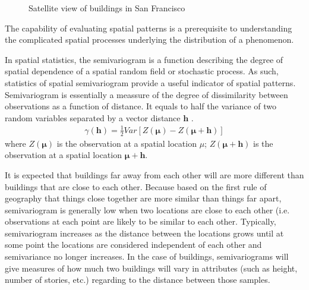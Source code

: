 \documentclass[letterpaper,10pt,english]{sphinxmanual}
\begin{document}
\begin{figure}[htbp]
\centering
\capstart

\noindent{}
\caption{Satellite view of buildings in San Francisco}\label{\detokenize{common/technical_manual/framework:id14}}\label{\detokenize{common/technical_manual/framework:brailsmapsf}}\end{figure}

\sphinxAtStartPar
The capability of evaluating spatial patterns is a prerequisite to understanding the
complicated spatial processes underlying the distribution of a phenomenon.

\sphinxAtStartPar
In spatial statistics, the semivariogram is a function describing the degree of spatial
dependence of a spatial random field or stochastic process.
As such, statistics of spatial semivariogram provide a useful indicator of spatial patterns.
Semivariogram is essentially  a meassure of the degree of dissimilarity between
observations as a function of distance. It equals to half the variance of two
random variables separated by a vector distance \(\boldsymbol{h}\)
.
\begin{equation}\label{equation:common/technical_manual/framework:eq:gamma}
\begin{split}\gamma (\boldsymbol{h})= \frac{1}{2}Var[Z(\boldsymbol{\mu}) - Z(\boldsymbol{\mu}+\boldsymbol{h})]\end{split}
\end{equation}
\sphinxAtStartPar
where \(Z(\boldsymbol{\mu})\) is the observation at a spatial location \(\mu\);
\(Z(\boldsymbol{\mu}+\boldsymbol{h})\) is the observation at a spatial location \(\boldsymbol{\mu}+\boldsymbol{h}\).

\sphinxAtStartPar
It is expected that buildings far away from each other will are more different
than buildings that are close to each other. Because based on the first rule of
geography that things close together are more similar than things far apart,
semivariogram is generally low when two locations are close to each other
(i.e. observations at each point are likely to be similar to each other.
Typically, semivariogram increases as the distance between the locations
grows until at some point the locations are considered independent of each other
and semi\sphinxhyphen{}variance no longer increases.
In the case of buildings,
semivariograms will give measures of how much two buildings will vary in attributes
(such as height, number of stories, etc.) regarding to the distance between those samples.
\end{document}
